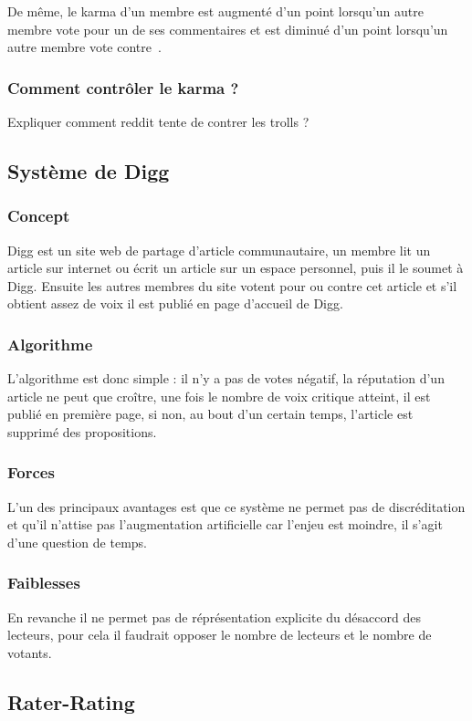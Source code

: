 \documentclass[a4paper, 11pt]{article} %
\begin{document}
De même, le karma d'un membre est augmenté d'un point lorsqu'un autre membre vote pour un de ses commentaires et est diminué d'un point lorsqu'un autre membre vote contre~\cite{RedditTroll}.

\subsubsection{Comment contrôler le karma ?}
Expliquer comment reddit tente de contrer les trolls ?


\subsection{Système de Digg}
\subsubsection{Concept}
Digg est un site web de partage d'article communautaire, un membre lit un article sur internet ou écrit un article sur un espace personnel, puis il le soumet à Digg.
Ensuite les autres membres du site votent pour ou contre cet article et s'il obtient assez de voix il est publié en page d'accueil de Digg.

\subsubsection{Algorithme}
L'algorithme est donc simple : il n'y a pas de votes négatif, la réputation d'un article ne peut que croître, une fois le nombre de voix critique atteint, il est publié en première page, si non, au bout d'un certain temps, l'article est supprimé des propositions.

\subsubsection{Forces}
L'un des principaux avantages est que ce système ne permet pas de discréditation et qu'il n'attise pas l'augmentation artificielle car l'enjeu est moindre, il s'agit d'une question de temps.

\subsubsection{Faiblesses}
En revanche il ne permet pas de réprésentation explicite du désaccord des lecteurs, pour cela il faudrait opposer le nombre de lecteurs et le nombre de votants.

\subsection{Rater-Rating}
\end{document}
